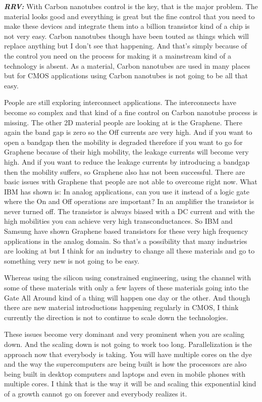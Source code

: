 \textbf{\textit{RRV:}} With Carbon nanotubes control is the key, that is the major problem. The material looks good and everything is great but the fine control that you need to make these devices and integrate them into a billion transistor kind of a chip is not very easy. Carbon nanotubes though have been touted as things which will replace anything but I don’t see that happening. And that’s simply because of the control you need on the process for making it a mainstream kind of a technology is absent. As a material, Carbon nanotubes are used in many places but for CMOS applications using Carbon nanotubes is not going to be all that easy.

People are still exploring interconnect applications. The interconnects have become so complex and that kind of a fine control on Carbon nanotube process is missing. The other 2D material people are looking at is the Graphene. There again the band gap is zero so the Off currents are very high. And if you want to open a bandgap then the mobility is degraded therefore if you want to go for Graphene because of their high mobility, the leakage currents will become very high. And if you want to reduce the leakage currents by introducing a bandgap then the mobility suffers, so Graphene also has not been successful. There are basic issues with Graphene that people are not able to overcome right now. What IBM has shown is: In analog applications, can you use it instead of a logic gate where the On and Off operations are important? In an amplifier the transistor is never turned off. The transistor is always biased with a DC current and with the high mobilities you can achieve very high transconductances. So IBM and Samsung have shown Graphene based transistors for these very high frequency applications in the analog domain. So that’s a possibility that many industries are looking at but I think for an industry to change all these materials and go to something very new is not going to be easy. 

Whereas using the silicon using constrained engineering, using the channel with some of these materials with only a few layers of these materials going into the Gate All Around kind of a thing will happen one day or the other. And though there are new material introductions happening regularly in CMOS, I think currently the direction is not to continue to scale down the technologies.

These issues become very dominant and very prominent when you are scaling down. And the scaling down is not going to work too long. Parallelization is the approach now that everybody is taking. You will have multiple cores on the dye and the way the supercomputers are being built is how the processors are also being built in desktop computers and laptops and even in mobile phones with multiple cores. I think that is the way it will be and scaling this exponential kind of a growth cannot go on forever and everybody realizes it.


